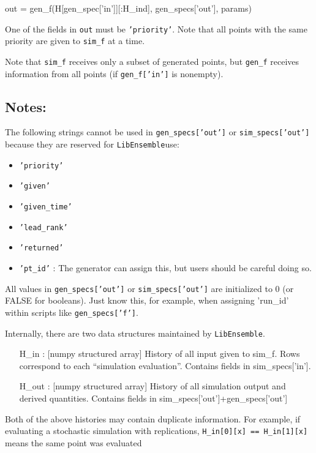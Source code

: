 \documentclass{article}
\newenvironment{allintypewriter}{\ttfamily}{\par}
\newcommand{\libE}{\texttt{LibEnsemble}}
\begin{document}
\begin{allintypewriter}
  out = gen\_f(H[gen\_spec['in']][:H\_ind], gen\_specs['out'], params)\\
\end{allintypewriter}

One of the fields in \texttt{out} must be \texttt{'priority'}. Note that all
points with the same priority are given to \texttt{sim\_f} at a time.

Note that \texttt{sim\_f} receives only a subset of generated points, but
\texttt{gen\_f} receives information from all points (if \texttt{gen\_f['in']}
is nonempty).

\subsection{Notes:}
The following strings cannot be used in  \texttt{gen\_specs['out']} or
\texttt{sim\_specs['out']} because they are reserved for \libE use:
\begin{itemize}
  \item \texttt{'priority'}
  \item \texttt{'given'}
  \item \texttt{'given\_time'}
  \item \texttt{'lead\_rank'}
  \item \texttt{'returned'}
  \item \texttt{'pt\_id'} : The generator can assign this, but users should be
    careful doing so.
\end{itemize}

All values in \texttt{gen\_specs['out']} or \texttt{sim\_specs['out']} are
initialized to 0 (or FALSE for booleans). Just know this, for example, when
assigning 'run\_id' within scripts like \texttt{gen\_specs['f']}.

Internally, there are two data structures maintained by \libE. 
\begin{allintypewriter}
  \begin{itemize}
    \item[H\_in]: [numpy structured array] History of all input given to
      sim\_f. Rows correspond to each ``simulation evaluation''. Contains fields
      in sim\_specs['in']. 
      
    \item[H\_out]: [numpy structured array] History of all simulation output
      and derived quantities. Contains fields in sim\_specs['out']+gen\_specs['out']
  \end{itemize}
\end{allintypewriter}
Both of the above histories may contain duplicate information. For example, if
evaluating a stochastic simulation with replications, \texttt{H\_in[0][x] == H\_in[1][x]} means the same point was evaluated
\end{document}
